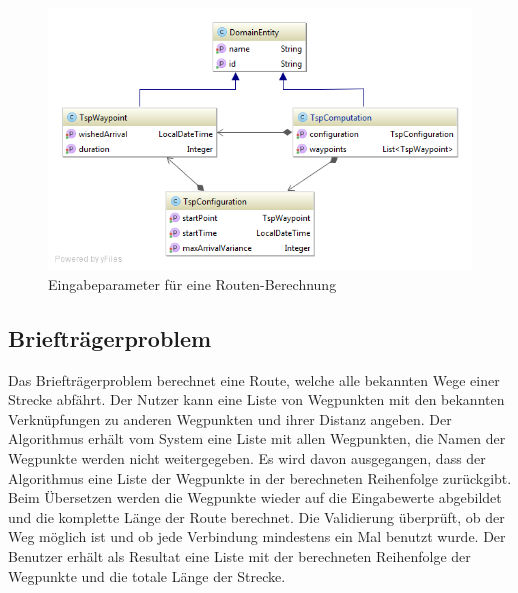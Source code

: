 \begin{figure}[h]
\centering
\includegraphics[scale=0.5]{images/probleme/tsp.png}
\caption[Eingabeparameter für eine Routen-Berechnung]{Eingabeparameter für eine Routen-Berechnung \selfmade{}}
\label{fig:tsp_input}
\end{figure}

%
%
%
%

\subsection{Briefträgerproblem}
Das Briefträgerproblem berechnet eine Route, welche alle bekannten Wege einer Strecke abfährt. Der Nutzer kann eine Liste von Wegpunkten mit den bekannten Verknüpfungen zu anderen 
Wegpunkten und ihrer Distanz angeben. Der Algorithmus erhält vom System eine Liste mit allen Wegpunkten, die Namen der Wegpunkte werden nicht weitergegeben. Es wird davon ausgegangen, 
dass der Algorithmus eine Liste der Wegpunkte in der berechneten Reihenfolge zurückgibt. Beim Übersetzen werden die Wegpunkte wieder auf die Eingabewerte abgebildet und die komplette 
Länge der Route berechnet. Die Validierung überprüft, ob der Weg möglich ist und ob jede Verbindung mindestens ein Mal benutzt wurde. Der Benutzer erhält als Resultat eine Liste mit der berechneten 
Reihenfolge der Wegpunkte und die totale Länge der Strecke.

